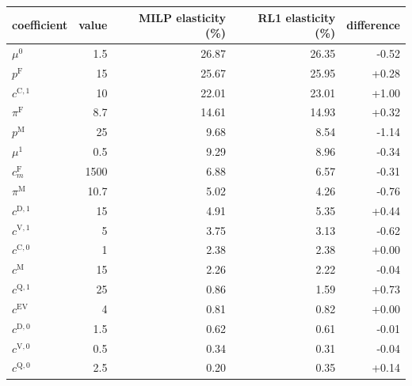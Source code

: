 \begin{tabular}{@{}lrrrr@{}}
\toprule
coefficient & value & MILP elasticity (\%) & RL1 elasticity (\%) & difference \\
\midrule
$\mu^{0}$ & 1.5 & 26.87 & 26.35 & -0.52 \\
$p^{\mathrm F}$ & 15 & 25.67 & 25.95 & +0.28 \\
$c^{\mathrm{C},1}$ & 10 & 22.01 & 23.01 & +1.00 \\
$\pi^{\mathrm F}$ & 8.7 & 14.61 & 14.93 & +0.32 \\
$p^{\mathrm M}$ & 25 & 9.68 & 8.54 & -1.14 \\
$\mu^{1}$ & 0.5 & 9.29 & 8.96 & -0.34 \\
$c^{\mathrm F}_m$ & 1500 & 6.88 & 6.57 & -0.31 \\
$\pi^{\mathrm M}$ & 10.7 & 5.02 & 4.26 & -0.76 \\
$c^{\mathrm{D},1}$ & 15 & 4.91 & 5.35 & +0.44 \\
$c^{\mathrm{V},1}$ & 5 & 3.75 & 3.13 & -0.62 \\
$c^{\mathrm{C},0}$ & 1 & 2.38 & 2.38 & +0.00 \\
$c^{\mathrm M}$ & 15 & 2.26 & 2.22 & -0.04 \\
$c^{\mathrm{Q},1}$ & 25 & 0.86 & 1.59 & +0.73 \\
$c^{\mathrm{EV}}$ & 4 & 0.81 & 0.82 & +0.00 \\
$c^{\mathrm{D},0}$ & 1.5 & 0.62 & 0.61 & -0.01 \\
$c^{\mathrm{V},0}$ & 0.5 & 0.34 & 0.31 & -0.04 \\
$c^{\mathrm{Q},0}$ & 2.5 & 0.20 & 0.35 & +0.14 \\
\bottomrule
\end{tabular}
